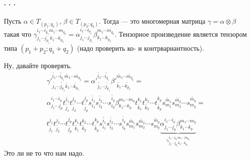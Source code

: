 \documentclass{article}
\begin{document}
    \paragraph{. . .}
    \begin{itemize}
        \dfn Пусть $\alpha\in T_{(p_1;q_1)}$, $\beta\in T_{(p_2;q_2)}$. Тогда  --- это многомерная матрица $\gamma=\alpha\otimes\beta$ такая что $\gamma^{i_1\cdots i_{q_1}m_1\cdots m_{q_2}}_{j_1\cdots j_{p_1}k_1\cdots k_{p_2}}=\alpha^{i_1\cdots i_{q_1}}_{j_1\cdots j_{p_1}}\beta^{m_1\cdots m_{q_2}}_{k_1\cdots k_{p_2}}$.
        \thm Тензорное произведение является тензором типа $(p_1+p_2;q_1+q_2)$ (надо проверить ко- и контрвариантность).
        \begin{Proof}
            Ну, давайте проверять.
            \[
            \begin{split}
                {\gamma'}^{\widetilde{i_1}\cdots\widetilde{i_{q_1}}\widetilde{m_1}\cdots\widetilde{m_{q_2}}}_{\widetilde{j_1}\cdots\widetilde{j_{p_1}}\widetilde{k_1}\cdots\widetilde{k_{p_2}}}={\alpha'}^{\widetilde{i_1}\cdots\widetilde{i_{q_1}}}_{\widetilde{j_1}\cdots\widetilde{j_{p_1}}}{\beta'}^{\widetilde{m_1}\cdots\widetilde{m_{q_2}}}_{\widetilde{k_1}\cdots\widetilde{k_{p_2}}}=\\
                \alpha^{i_1\cdots i_q}_{j_1\cdots j_p}t_{\widetilde{j_1}}^{j_1}t_{\widetilde{j_2}}^{j_2}\cdots t_{\widetilde{j_p}}^{j_p}s_{i_1}^{\widetilde{i_1}}s_{i_2}^{\widetilde{i_2}}\cdots s_{i_q}^{\widetilde{i_q}}\beta^{m_1\cdots m_q}_{k_1\cdots k_p}t_{\widetilde{k_1}}^{k_1}t_{\widetilde{k_2}}^{k_2}\cdots t_{\widetilde{k_p}}^{k_p}s_{m_1}^{\widetilde{m_1}}s_{m_2}^{\widetilde{m_2}}\cdots s_{m_q}^{\widetilde{m_q}}=\\
                t_{\widetilde{j_1}}^{j_1}t_{\widetilde{j_2}}^{j_2}\cdots t_{\widetilde{j_p}}^{j_p}t_{\widetilde{k_1}}^{k_1}t_{\widetilde{k_2}}^{k_2}\cdots t_{\widetilde{k_p}}^{k_p}s_{i_1}^{\widetilde{i_1}}s_{i_2}^{\widetilde{i_2}}\cdots s_{i_q}^{\widetilde{i_q}}s_{m_1}^{\widetilde{m_1}}s_{m_2}^{\widetilde{m_2}}\cdots s_{m_q}^{\widetilde{m_q}}\underbrace{\alpha^{i_1\cdots i_q}_{j_1\cdots j_p}\beta^{m_1\cdots m_q}_{k_1\cdots k_p}}_{\gamma^{i_1\cdots i_{q_1}m_1\cdots m_{q_2}}_{j_1\cdots j_{p_1}k_1\cdots k_{p_2}}}
            \end{split}
            \]
            Это ли не то что нам надо.
        \end{Proof}

\end{itemize}
\end{document}
